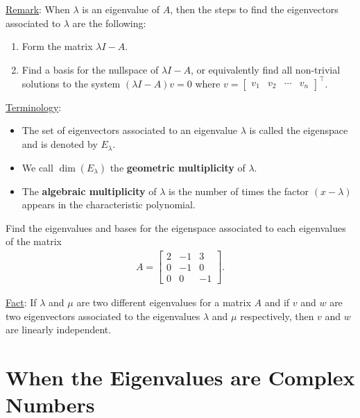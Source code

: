 \documentclass[12pt,a4paper]{article}
\newcounter{example}[section]
\begin{document}
	\vfill
	
	\underline{Remark}: When $\lambda$ is an eigenvalue of $A$, then the steps to find the eigenvectors associated to $\lambda$ are the following:
		\begin{enumerate}
		\item Form the matrix $\lambda I - A$.
		\item Find a basis for the nullspace of $\lambda I - A$, or equivalently find all non-trivial solutions to the system $(\lambda I - A) v = 0$ where $v = \begin{bmatrix} v_1 & v_2 & \cdots & v_n \end{bmatrix}^{\top}$.
		\end{enumerate}
	
	\underline{Terminology}:
		\begin{itemize}
		\item The set of eigenvectors associated to an eigenvalue $\lambda$ is called the eigenspace and is denoted by $E_\lambda$.
		\item We call $\dim (E_{\lambda})$ the \textbf{geometric multiplicity} of $\lambda$. 
		\item The \textbf{algebraic multiplicity} of $\lambda$ is the number of times the factor $(x - \lambda )$ appears in the characteristic polynomial.
		\end{itemize}
		
	\newpage
	
	\begin{example}
	Find the eigenvalues and bases for the eigenspace associated to each eigenvalues of the matrix
		\begin{align*}
		A = \begin{bmatrix}
		2 & -1 & 3 \\
		0 & -1 & 0 \\
		0 & 0 & -1
		\end{bmatrix} .
		\end{align*}
	\end{example}
	
	\vfill
	
	\underline{Fact}: If $\lambda$ and $\mu$ are two different eigenvalues for a matrix $A$ and if $v$ and $w$ are two eigenvectors associated to the eigenvalues $\lambda$ and $\mu$ respectively, then $v$ and $w$ are linearly independent.
	
	\newpage
	
	\section{When the Eigenvalues are Complex Numbers}
		
\end{document}
